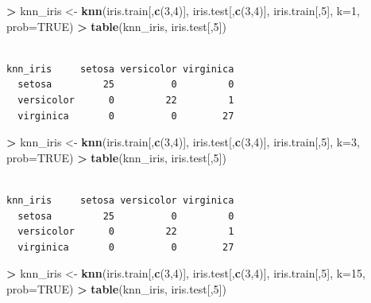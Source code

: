 \documentclass[]{krantz}
\makeatletter
\newenvironment{Shaded}{\begin{snugshade}}{\end{snugshade}}
\newcommand{\KeywordTok}[1]{\textcolor[rgb]{0.27,0.27,0.27}{\textbf{#1}}}
\newcommand{\DataTypeTok}[1]{\textcolor[rgb]{0.27,0.27,0.27}{#1}}
\newcommand{\DecValTok}[1]{\textcolor[rgb]{0.06,0.06,0.06}{#1}}
\newcommand{\StringTok}[1]{\textcolor[rgb]{0.5,0.5,0.5}{#1}}
\newcommand{\OtherTok}[1]{\textcolor[rgb]{0.37,0.37,0.37}{#1}}
\newcommand{\OperatorTok}[1]{\textcolor[rgb]{0.43,0.43,0.43}{\textbf{#1}}}
\newcommand{\NormalTok}[1]{#1}
\newenvironment{kframe}{%
\medskip{}
\setlength{\fboxsep}{.8em}
 \def\at@end@of@kframe{}%
 \ifinner\ifhmode%
  \def\at@end@of@kframe{\end{minipage}}%
  \begin{minipage}{\columnwidth}%
 \fi\fi%
 \def\FrameCommand##1{\hskip\@totalleftmargin \hskip-\fboxsep
 \colorbox{shadecolor}{##1}\hskip-\fboxsep
     \hskip-\linewidth \hskip-\@totalleftmargin \hskip\columnwidth}%
 \MakeFramed {\advance\hsize-\width
   \@totalleftmargin\z@ \linewidth\hsize
   \@setminipage}}%
 {\par\unskip\endMakeFramed%
 \at@end@of@kframe}
\renewenvironment{Shaded}{\begin{kframe}}{\end{kframe}}
\makeatother
\begin{document}
\begin{Shaded}
\begin{Highlighting}[]
\OperatorTok{>}\StringTok{ }\NormalTok{knn_iris <-}\StringTok{ }\KeywordTok{knn}\NormalTok{(iris.train[,}\KeywordTok{c}\NormalTok{(}\DecValTok{3}\NormalTok{,}\DecValTok{4}\NormalTok{)], iris.test[,}\KeywordTok{c}\NormalTok{(}\DecValTok{3}\NormalTok{,}\DecValTok{4}\NormalTok{)], iris.train[,}\DecValTok{5}\NormalTok{], }\DataTypeTok{k=}\DecValTok{1}\NormalTok{, }\DataTypeTok{prob=}\OtherTok{TRUE}\NormalTok{)}
\OperatorTok{>}\StringTok{ }\KeywordTok{table}\NormalTok{(knn_iris, iris.test[,}\DecValTok{5}\NormalTok{])}
\end{Highlighting}
\end{Shaded}

\begin{verbatim}
            
knn_iris     setosa versicolor virginica
  setosa         25          0         0
  versicolor      0         22         1
  virginica       0          0        27
\end{verbatim}

\begin{Shaded}
\begin{Highlighting}[]
\OperatorTok{>}\StringTok{ }\NormalTok{knn_iris <-}\StringTok{ }\KeywordTok{knn}\NormalTok{(iris.train[,}\KeywordTok{c}\NormalTok{(}\DecValTok{3}\NormalTok{,}\DecValTok{4}\NormalTok{)], iris.test[,}\KeywordTok{c}\NormalTok{(}\DecValTok{3}\NormalTok{,}\DecValTok{4}\NormalTok{)], iris.train[,}\DecValTok{5}\NormalTok{], }\DataTypeTok{k=}\DecValTok{3}\NormalTok{, }\DataTypeTok{prob=}\OtherTok{TRUE}\NormalTok{)}
\OperatorTok{>}\StringTok{ }\KeywordTok{table}\NormalTok{(knn_iris, iris.test[,}\DecValTok{5}\NormalTok{])}
\end{Highlighting}
\end{Shaded}

\begin{verbatim}
            
knn_iris     setosa versicolor virginica
  setosa         25          0         0
  versicolor      0         22         1
  virginica       0          0        27
\end{verbatim}

\begin{Shaded}
\begin{Highlighting}[]
\OperatorTok{>}\StringTok{ }\NormalTok{knn_iris <-}\StringTok{ }\KeywordTok{knn}\NormalTok{(iris.train[,}\KeywordTok{c}\NormalTok{(}\DecValTok{3}\NormalTok{,}\DecValTok{4}\NormalTok{)], iris.test[,}\KeywordTok{c}\NormalTok{(}\DecValTok{3}\NormalTok{,}\DecValTok{4}\NormalTok{)], iris.train[,}\DecValTok{5}\NormalTok{], }\DataTypeTok{k=}\DecValTok{15}\NormalTok{, }\DataTypeTok{prob=}\OtherTok{TRUE}\NormalTok{)}
\OperatorTok{>}\StringTok{ }\KeywordTok{table}\NormalTok{(knn_iris, iris.test[,}\DecValTok{5}\NormalTok{])}
\end{Highlighting}
\end{Shaded}
\end{document}
